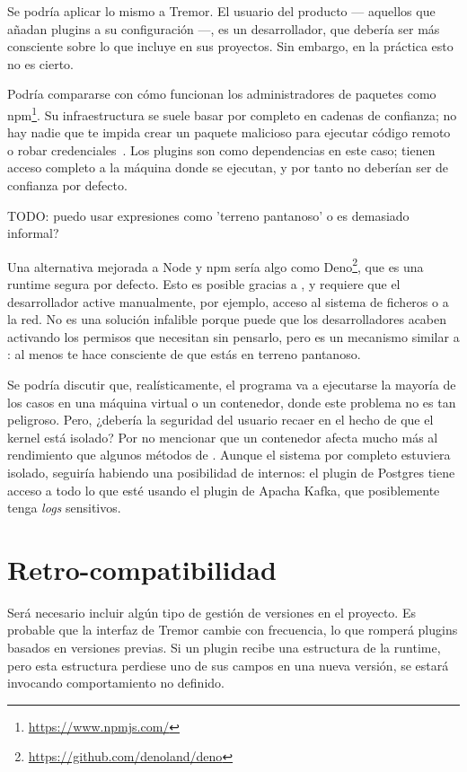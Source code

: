Se podría aplicar lo mismo a Tremor. El usuario del producto --- aquellos que
añadan plugins a su configuración ---, es un desarrollador, que debería ser más
consciente sobre lo que incluye en sus proyectos. Sin embargo, en la práctica
esto no es cierto.

Podría compararse con cómo funcionan los administradores de paquetes como
npm\footnote{\url{https://www.npmjs.com/}}. Su infraestructura se suele basar
por completo en cadenas de confianza; no hay nadie que te impida crear un
paquete malicioso para ejecutar código remoto o robar
credenciales~\cite{npm1}\cite{npm2}. Los plugins son como dependencias en este
caso; tienen acceso completo a la máquina donde se ejecutan, y por tanto no
deberían ser de confianza por defecto.

TODO: puedo usar expresiones como 'terreno pantanoso' o es demasiado informal?

Una alternativa mejorada a Node y npm sería algo como
Deno\footnote{\url{https://github.com/denoland/deno}}, que es una runtime segura
por defecto. Esto es posible gracias a \sandboxing, y requiere que el
desarrollador active manualmente, por ejemplo, acceso al sistema de ficheros o a
la red. No es una solución infalible porque puede que los desarrolladores acaben
activando los permisos que necesitan sin pensarlo, pero es un mecanismo similar
a \unsafe: al menos te hace consciente de que estás en terreno pantanoso.

Se podría discutir que, realísticamente, el programa va a ejecutarse la mayoría
de los casos en una máquina virtual o un contenedor, donde este problema no es
tan peligroso. Pero, ¿debería la seguridad del usuario recaer en el hecho de que
el kernel está isolado? Por no mencionar que un contenedor afecta mucho más al
rendimiento que algunos métodos de \sandboxing. Aunque el sistema por completo
estuviera isolado, seguiría habiendo una posibilidad de \leaks internos: el
plugin de Postgres tiene acceso a todo lo que esté usando el plugin de Apacha
Kafka, que posiblemente tenga \emph{logs} sensitivos.

\section{Retro-compatibilidad}\label{sec:compat}

Será necesario incluir algún tipo de gestión de versiones en el proyecto. Es
probable que la interfaz de Tremor cambie con frecuencia, lo que romperá plugins
basados en versiones previas. Si un plugin recibe una estructura de la runtime,
pero esta estructura perdiese uno de sus campos en una nueva versión, se estará
invocando comportamiento no definido.


